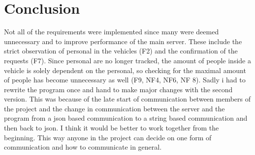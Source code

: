 \section{Conclusion}
\label{sec:5}
Not all of the requirements were implemented since many were deemed unnecessary and to improve performance of the main server. These include the strict observation of personal in the vehicles (F2) and the confirmation of the requests (F7). Since personal are no longer tracked, the amount of people inside a vehicle is solely dependent on the personal, so checking for the maximal amount of people has become unnecessary as well (F9, NF4, NF6, NF 8).
\newline
Sadly i had to rewrite the program once and hand to make major changes with the second version. This was because of the late start of communication between members of the project and the change in communication between the server and the program from a json based communication to a string based communication and then back to json. I think it would be better to work together from the beginning. This way anyone in the project can decide on one form of communication and how to communicate in general.

\newpage


